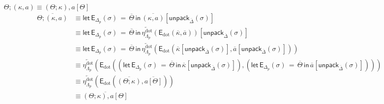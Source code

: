 \documentclass[10pt]{article}
\theoremstyle{definition}
\newcommand{\rewrite}[2]{\overleftarrow{#1}(#2)}
\newcommand\EEs[4]{\ensuremath{\mathsf{let} \, \mathsf{E}_{#1}(#3) \, = \, {#2} \, \mathsf{in} \, #4}}
\newcommand\EIs[2]{\ensuremath{\mathsf{E}_{#1}{(#2)}}}
\newcommand\unpack[2]{\ensuremath{\mathsf{unpack}_{#1}(#2)}}
\newcommand{\modeof}[1]{{#1}_p}
\newcommand{\sdot}{\ensuremath{\mathrm{dot}}}
\newcommand{\upstairs}[1]{\overline{#1}}
\begin{document}
\begin{enumerate}[style = multiline, labelwidth = 80pt]
\item[{$\Theta ; (\kappa , a) \equiv (\Theta ; \kappa) , a[\Theta]$}]
\begin{align*}
\upstairs{\Theta ; (\kappa , a)}
&\equiv \EEs{\modeof{\Delta}}{\upstairs{\Theta}}{\sigma}{\upstairs{(\kappa , a)}[\unpack{\upstairs{\Delta}}{\sigma}]} \\
&\equiv \EEs{\modeof{\Delta}}{\upstairs{\Theta}}{\sigma}{\rewrite{\eta^\sdot_{\modeof{\Lambda}}}{\EIs{\sdot}{\upstairs{\kappa}, \upstairs{a}}}[\unpack{\upstairs{\Delta}}{\sigma}]} \\
&\equiv \EEs{\modeof{\Delta}}{\upstairs{\Theta}}{\sigma}{\rewrite{\eta^\sdot_{\modeof{\Lambda}}}{\EIs{\sdot}{\upstairs{\kappa}[\unpack{\upstairs{\Delta}}{\sigma}], \upstairs{a}[\unpack{\upstairs{\Delta}}{\sigma}]}}} \\
&\equiv \rewrite{\eta^\sdot_{\modeof{\Lambda}}}{\EIs{\sdot}{(\EEs{\modeof{\Delta}}{\upstairs{\Theta}}{\sigma}{\upstairs{\kappa}[\unpack{\upstairs{\Delta}}{\sigma}]}), (\EEs{\modeof{\Delta}}{\upstairs{\Theta}}{\sigma}{\upstairs{a}[\unpack{\upstairs{\Delta}}{\sigma}]})}} \\
&\equiv \rewrite{\eta^\sdot_{\modeof{\Lambda}}}{\EIs{\sdot}{\upstairs{(\Theta ; \kappa)}, \upstairs{a[\Theta]}}} \\
&\equiv \upstairs{(\Theta ; \kappa) , a[\Theta]}
\end{align*} 


\end{enumerate}
\end{document}
